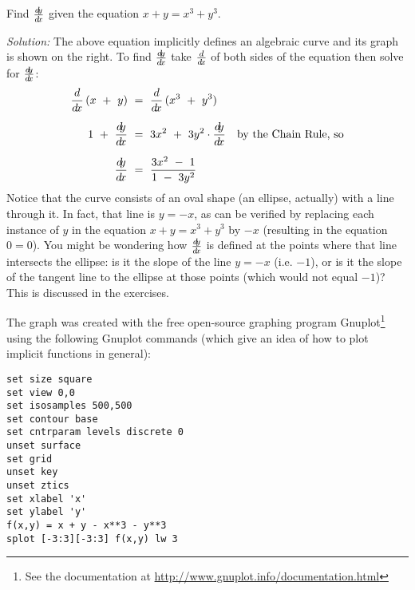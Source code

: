 \begin{exmp}\label{exmp:implicit2}
\parpic[r]{}
\noindent Find $\frac{d\negmedspace y}{d\!x}$ given the equation $x + y = x^3 + y^3$.\vspace{1mm}
\par\noindent\emph{Solution:} The above equation implicitly defines an
algebraic curve and its graph is shown on the right. To find
$\frac{d\negmedspace y}{d\!x}$ take $\frac{d}{d\!x}$ of both sides of the equation then solve for $\frac{d\negmedspace y}{d\!x}$:
\begin{align*}
\ddx\,(x ~+~ y) ~&=~ \ddx\,(x^3 ~+~ y^3)\\[6pt]
1 ~+~ \dydx ~&=~ 3x^2 ~+~ 3y^2 \cdot \dydx \quad\text{by the Chain Rule, so}\\[6pt]
\dydx ~&=~ \frac{3x^2 ~-~ 1}{1 ~-~ 3y^2}
\end{align*}\vspace{-9mm}
Notice that the curve consists of an oval shape (an ellipse, actually) with a
line through it. In fact,
that line is $y = -x$, as can be verified by replacing each instance of $y$ in
the equation $x + y = x^3 + y^3$ by $-x$ (resulting in the equation $0=0$). You
might be wondering how $\frac{d\negmedspace y}{d\!x}$ is defined at the points where that line
intersects the ellipse: is it the slope of the line $y=-x$ (i.e. $-1$), or is it
the slope of the tangent line to the ellipse at those points (which would not
equal $-1$)? This is discussed in the exercises.

The graph was created with the free open-source graphing program
Gnuplot\footnote{See the documentation at
\url{http://www.gnuplot.info/documentation.html}} using the
following Gnuplot commands (which give an idea of how to plot implicit functions
in general):

\begin{Verbatim}[frame=single,framesep=3pt]
set size square
set view 0,0
set isosamples 500,500
set contour base
set cntrparam levels discrete 0
unset surface
set grid
unset key
unset ztics
set xlabel 'x'
set ylabel 'y'
f(x,y) = x + y - x**3 - y**3
splot [-3:3][-3:3] f(x,y) lw 3
\end{Verbatim}
\end{exmp}
\divider
\vspace{3mm}

